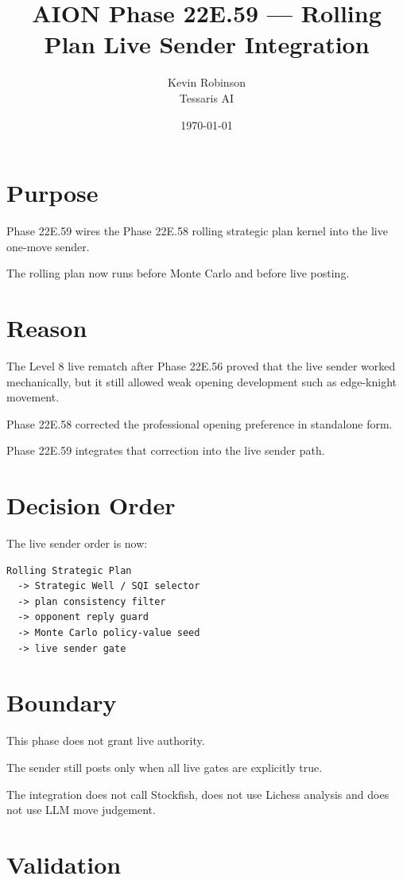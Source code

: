 \documentclass[11pt,a4paper]{article}
\title{\textbf{AION Phase 22E.59 --- Rolling Plan Live Sender Integration}}
\author{Kevin Robinson\\Tessaris AI}
\date{\today}
\begin{document}
\maketitle

\section{Purpose}

Phase 22E.59 wires the Phase 22E.58 rolling strategic plan kernel into the live one-move sender.

The rolling plan now runs before Monte Carlo and before live posting.

\section{Reason}

The Level 8 live rematch after Phase 22E.56 proved that the live sender worked mechanically, but it still allowed weak opening development such as edge-knight movement.

Phase 22E.58 corrected the professional opening preference in standalone form.

Phase 22E.59 integrates that correction into the live sender path.

\section{Decision Order}

The live sender order is now:

\begin{verbatim}
Rolling Strategic Plan
  -> Strategic Well / SQI selector
  -> plan consistency filter
  -> opponent reply guard
  -> Monte Carlo policy-value seed
  -> live sender gate
\end{verbatim}

\section{Boundary}

This phase does not grant live authority.

The sender still posts only when all live gates are explicitly true.

The integration does not call Stockfish, does not use Lichess analysis and does not use LLM move judgement.

\section{Validation}
\end{document}
